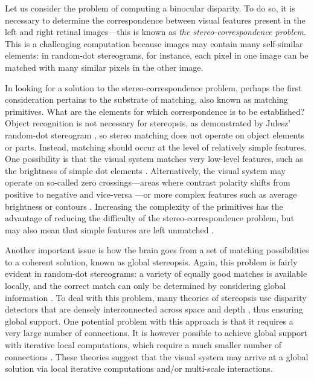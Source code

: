 Let us consider the problem of computing a binocular disparity. To do so, it is necessary to determine the correspondence between visual features present in the left and right retinal images---this is known as \textit{the stereo-correspondence problem}. This is a challenging computation because images may contain many self-similar elements: in random-dot stereograms, for instance, each pixel in one image can be matched with many similar pixels in the other image. 

In looking for a solution to the stereo-correspondence problem, perhaps the first consideration pertains to the substrate of matching, also known as matching primitives. What are the elements for which correspondence is to be established? Object recognition is not necessary for stereopsis, as demonstrated by Julesz' random-dot stereogram \cite{BLTJ:BLTJ3954}, so stereo matching does not operate on object elements or parts. Instead, matching should occur at the level of relatively simple features. One possibility is that the visual system matches very low-level features, such as the brightness of simple dot elements \cite{Marr:1976dq,MAYHEW1981349}. Alternatively, the visual system may operate on so-called zero crossings---areas where contrast polarity shifts from positive to negative and vice-versa \cite{Marr:1979lh,Grimson:1981bs}---or more complex features such as average brightness or contours \cite{KAUFMAN:1964kx,KAUFMAN:1965vn,Ramachandran:1973kl,Ramachandran:1976mi}. Increasing the complexity of the primitives has the advantage of reducing the difficulty of the stereo-correspondence problem, but may also mean that simple features are left unmatched \cite{Marr:1979lh,MAYHEW1981349,Anderson:1994fk}. 

Another important issue is how the brain goes from a set of matching possibilities to a coherent solution, known as global stereopsis. Again, this problem is fairly evident in random-dot stereograms: a variety of equally good matches is available locally, and the correct match can only be determined by considering global information \cite{Julesz:1971uq}. To deal with this problem, many theories of stereopsis use disparity detectors that are densely interconnected across space and depth \cite{Julesz:1971uq,Marr:1976dq,Sperling:1970ys,Prazdny:1985vn,Nelson:1975oq}, thus ensuring global support. One potential problem with this approach is that it requires a very large number of connections. It is however possible to achieve global support with iterative local computations, which require a much smaller number of connections \cite{export:75622}. These theories suggest that the visual system may arrive at a global solution via local iterative computations and/or multi-scale interactions.

